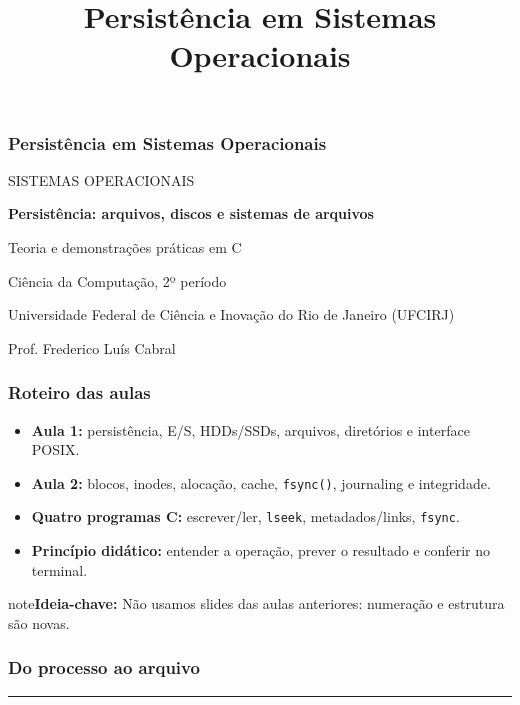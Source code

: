 \documentclass[aspectratio=169,11pt]{beamer}
\title{Persistência em Sistemas Operacionais}
\begin{document}
\begin{frame}
\frametitle{Persistência em Sistemas Operacionais}

\vspace{7mm}
{\color{teal}\large SISTEMAS OPERACIONAIS}\par\vspace{3mm}
{\fontsize{29}{34}\selectfont\bfseries Persistência: arquivos, discos e sistemas de arquivos}\par\vspace{5mm}
{\large Teoria e demonstrações práticas em C}\par\vspace{7mm}
{\normalsize Ciência da Computação, 2º período}\par
{\small Universidade Federal de Ciência e Inovação do Rio de Janeiro (UFCIRJ)}\par
{\small Prof. Frederico Luís Cabral}

\end{frame}

\begin{frame}
\frametitle{Roteiro das aulas}
\large
\begin{itemize}
\item \textbf{Aula 1:} persistência, E/S, HDDs/SSDs, arquivos, diretórios e interface POSIX.
\item \textbf{Aula 2:} blocos, inodes, alocação, cache, \texttt{fsync()}, journaling e integridade.
\item \textbf{Quatro programas C:} escrever/ler, \texttt{lseek}, metadados/links, \texttt{fsync}.
\item \textbf{Princípio didático:} entender a operação, prever o resultado e conferir no terminal.
\end{itemize}
\vfill\begin{beamercolorbox}[wd=\textwidth,sep=2mm,rounded=true]{note}\small\textbf{Ideia-chave:} Não usamos slides das aulas anteriores: numeração e estrutura são novas.\end{beamercolorbox}
\end{frame}

\begin{frame}
\frametitle{Do processo ao arquivo}
\par{}\par\vspace{5mm}{\large Interfaces, dispositivos e a ideia de persistência.}\vfill{\color{lightgray}\rule{\textwidth}{1pt}}
\end{frame}
\end{document}
